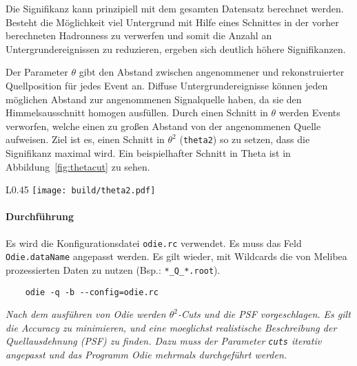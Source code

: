 Die Signifikanz kann prinzipiell mit dem gesamten Datensatz berechnet werden. 
Besteht die Möglichkeit viel Untergrund mit Hilfe eines Schnittes 
in der vorher berechneten Hadronness zu verwerfen 
und somit die Anzahl an Untergrundereignissen zu reduzieren, 
ergeben sich deutlich höhere Signifikanzen.

Der Parameter $\theta$ gibt den Abstand zwischen
angenommener und rekonstruierter Quellposition
für jedes Event an.
Diffuse Untergrundereignisse können jeden möglichen Abstand zur
angenommenen Signalquelle haben,
da sie den Himmelsausschnitt homogen ausfüllen.
Durch einen Schnitt in $\theta$ werden Events verworfen,
welche einen zu großen Abstand von der angenommenen Quelle aufweisen.
Ziel ist es, einen Schnitt in $\theta^2$ (\texttt{theta2}) so zu setzen,
dass die Signifikanz maximal wird.
Ein beispielhafter Schnitt in Theta ist in
Abbildung~\ref{fig:thetacut} zu sehen.

\begin{wrapfigure}[12]{L}{0.45\textwidth}
		\centering
		\texttt{[image: build/theta2.pdf]}
		\caption{Theta2 Schnitt auf Daten zur Maximierung der Signifikanz.}%
		\label{fig:thetacut}
\end{wrapfigure}

\paragraph{Durchführung}%

Es wird die Konfigurationsdatei \texttt{odie.rc} verwendet.
Es muss das Feld \texttt{Odie.dataName} angepasst werden.
Es gilt wieder, mit Wildcards die von Melibea prozessierten Daten zu nutzen
(Bsp.: \texttt{*\_Q\_*.root}).

\begin{lstlisting}
	odie -q -b --config=odie.rc
\end{lstlisting}

\textit{Nach dem ausführen von Odie werden $\theta^2$-Cuts und die PSF vorgeschlagen.
Es gilt die Accuracy zu minimieren,
und eine moeglichst realistische Beschreibung der Quellausdehnung (PSF) zu finden.
Dazu muss der Parameter \texttt{cuts} iterativ angepasst und das Programm Odie
mehrmals durchgeführt werden.
}
